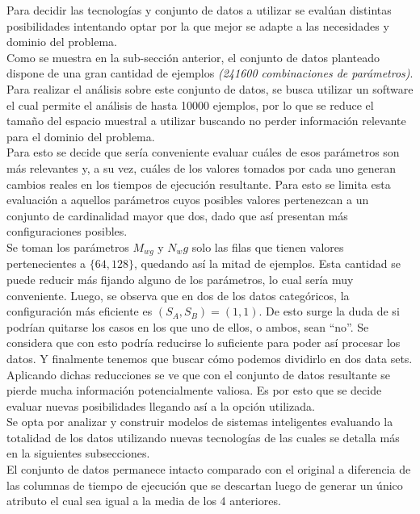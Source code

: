 \documentclass[osajnl,twocolumn,showpacs,superscriptaddress,10pt]{revtex4-1} %
\begin{document}
Para decidir las tecnologías y conjunto de datos a utilizar se evalúan distintas posibilidades intentando optar por la que mejor se adapte a las necesidades y dominio del problema. \\

Como se muestra en la sub-sección anterior, el conjunto de datos planteado dispone de una gran cantidad de ejemplos \textit{(241600 combinaciones de parámetros)}. Para realizar el análisis sobre este conjunto de datos, se busca utilizar un software el cual permite el análisis de hasta 10000 ejemplos, por lo que se reduce el tamaño del espacio muestral a utilizar buscando no perder información relevante para el dominio del problema. \\

Para esto se decide que sería conveniente evaluar cuáles de esos parámetros son más relevantes y, a su vez, cuáles de los valores tomados por cada uno generan cambios reales en los tiempos de ejecución resultante. Para esto se limita esta evaluación a aquellos parámetros cuyos posibles valores pertenezcan a un conjunto de cardinalidad mayor que dos, dado que así presentan más configuraciones posibles. \\

Se toman los parámetros $M_{wg}$ y $N_wg$ solo las filas que tienen valores pertenecientes a $\{64, 128\}$, quedando así la mitad de ejemplos. Esta cantidad se puede reducir más fijando alguno de los parámetros, lo cual sería muy conveniente. Luego, se observa que en dos de los datos categóricos, la configuración más eficiente es $(S_{A}, S_{B}) = (1, 1)$. De esto surge la duda de si podrían quitarse los casos en los que uno de ellos, o ambos, sean “no”. Se considera que con esto podría reducirse lo suficiente para poder así procesar los datos. Y finalmente tenemos que buscar cómo podemos dividirlo en dos data sets. \\

Aplicando dichas reducciones se ve que con el conjunto de datos resultante se pierde mucha información potencialmente valiosa. Es por esto que se decide evaluar nuevas posibilidades llegando así a la opción utilizada. \\

Se opta por analizar y construir modelos de sistemas inteligentes evaluando la totalidad de los datos utilizando nuevas tecnologías de las cuales se detalla más en la siguientes subsecciones. \\

El conjunto de datos permanece intacto comparado con el original a diferencia de las columnas de tiempo de ejecución que se descartan luego de generar un único atributo el cual sea igual a la media de los 4 anteriores. \\
\end{document}
